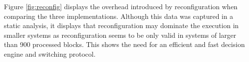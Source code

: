 Figure \ref{fig:reconfig} displays the overhead introduced by reconfiguration when comparing the three implementations. Although this data was captured in a static analysis, it displays that reconfiguration may dominate the execution in smaller systems as reconfiguration seems to be only valid in systems of larger than 900 processed blocks. This shows the need for an efficient and fast decision engine and switching protocol. 
%
